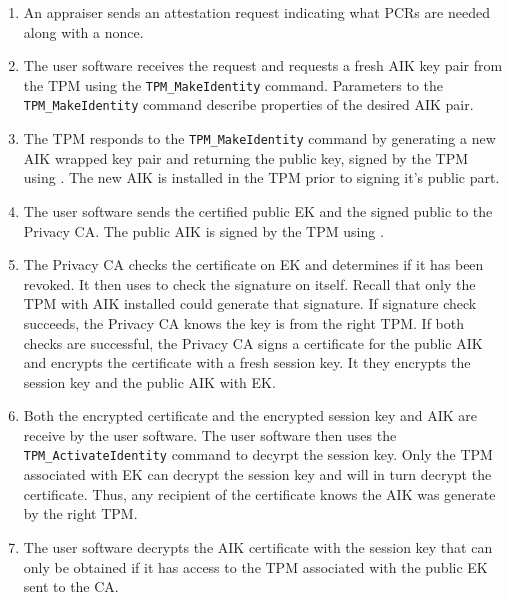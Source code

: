 \documentclass[10pt]{article}
\begin{document}
\begin{enumerate}
  \parskip=0pt\itemsep=0pt
\item An appraiser sends an attestation request indicating what PCRs
  are needed along with a nonce.

\item The user software receives the request and requests a fresh AIK
  key pair from the TPM using the \verb+TPM_MakeIdentity+ command.
  Parameters to the \verb+TPM_MakeIdentity+ command describe
  properties of the desired AIK pair.

\item The TPM responds to the \verb+TPM_MakeIdentity+ command by
  generating a new AIK wrapped key pair and returning the public key,
   signed by the TPM using .  The new AIK is
  installed in the TPM prior to signing it's public part.

\item The user software sends the certified public EK and the signed
  public  to the Privacy CA.  The public AIK is signed by
  the TPM using .

\item The Privacy CA checks the certificate on EK and determines if it
  has been revoked.  It then uses  to check the signature
  on itself.  Recall that only the TPM with AIK installed could
  generate that signature.  If signature check succeeds, the Privacy
  CA knows the key is from the right TPM.  If both checks are
  successful, the Privacy CA signs a certificate for the public AIK
  and encrypts the certificate with a fresh session key.  It they
  encrypts the session key and the public AIK with EK.

\item Both the encrypted certificate and the encrypted session key and
  AIK are receive by the user software.  The user software then uses
  the \verb+TPM_ActivateIdentity+ command to decyrpt the session key.
  Only the TPM associated with EK can decrypt the session key and will
  in turn decrypt the certificate.  Thus, any recipient of the
  certificate knows the AIK was generate by the right TPM.

\item The user software decrypts the AIK certificate with the session
  key that can only be obtained if it has access to the TPM associated
  with the public EK sent to the CA.



\end{enumerate}
\end{document}
